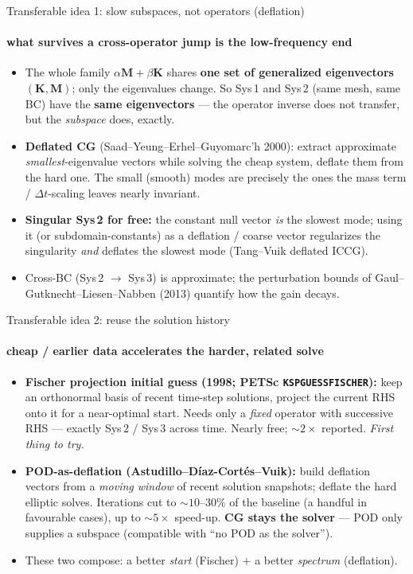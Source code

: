 \documentclass[aspectratio=169,10pt]{beamer}
\newcommand{\Mmat}{\mathbf M}
\newcommand{\Kmat}{\mathbf K}
\begin{document}
\begin{frame}{Transferable idea 1: slow subspaces, not operators (deflation)}
\framesubtitle{what survives a cross-operator jump is the low-frequency end}
\begin{itemize}\itemsep0.35em
  \item The whole family $\alpha\Mmat+\beta\Kmat$ shares \textbf{one set of generalized eigenvectors} $(\Kmat,\Mmat)$; only the eigenvalues change. So Sys\,1 and Sys\,2 (same mesh, same BC) have the \textbf{same eigenvectors} --- the operator inverse does not transfer, but the \emph{subspace} does, exactly.
  \item \textbf{Deflated CG} (Saad--Yeung--Erhel--Guyomarc'h 2000): extract approximate \emph{smallest}-eigenvalue vectors while solving the cheap system, deflate them from the hard one. The small (smooth) modes are precisely the ones the mass term / $\Delta t$-scaling leaves nearly invariant.
  \item \textbf{Singular Sys\,2 for free:} the constant null vector \emph{is} the slowest mode; using it (or subdomain-constants) as a deflation / coarse vector regularizes the singularity \emph{and} deflates the slowest mode (Tang--Vuik deflated ICCG).
  \item Cross-BC (Sys\,2 $\to$ Sys\,3) is approximate; the perturbation bounds of Gaul--Gutknecht--Liesen--Nabben (2013) quantify how the gain decays.
\end{itemize}
\end{frame}

\begin{frame}{Transferable idea 2: reuse the solution history}
\framesubtitle{cheap / earlier data accelerates the harder, related solve}
\begin{itemize}\itemsep0.4em
  \item \textbf{Fischer projection initial guess (1998; PETSc \texttt{KSPGUESSFISCHER}):} keep an orthonormal basis of recent time-step solutions, project the current RHS onto it for a near-optimal start. Needs only a \emph{fixed} operator with successive RHS --- exactly Sys\,2 / Sys\,3 across time. Nearly free; $\sim 2\times$ reported. \emph{First thing to try.}
  \item \textbf{POD-as-deflation (Astudillo--D\'iaz-Cort\'es--Vuik):} build deflation vectors from a \emph{moving window} of recent solution snapshots; deflate the hard elliptic solves. Iterations cut to ${\sim}10\text{--}30\%$ of the baseline (a handful in favourable cases), up to $\sim 5\times$ speed-up. \textbf{CG stays the solver} --- POD only supplies a subspace (compatible with ``no POD as the solver'').
  \item These two compose: a better \emph{start} (Fischer) $+$ a better \emph{spectrum} (deflation).
\end{itemize}
\end{frame}
\end{document}
